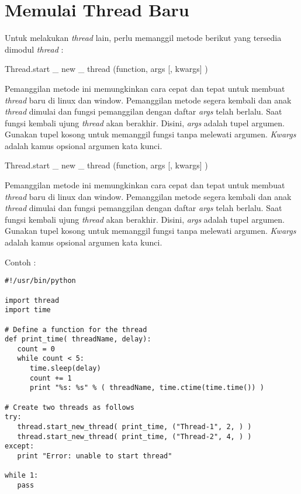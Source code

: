 \documentclass [12pt,a4paper,notitlepage,oneside,bahasa]{article}
\begin{document}
\section{Memulai Thread Baru}
\noindent 
\hspace*{0.5in} Untuk melakukan \textit{thread} lain, perlu memanggil metode berikut yang tersedia dimodul \textit{thread} :
\noindent 
\begin{center}{\fontsize{9pt}{9pt}\selectfont Thread.start  \_  new   \_  thread (function, args [, kwargs] )}\end{center}
Pemanggilan metode ini memungkinkan cara cepat dan tepat untuk membuat \textit{thread} baru di linux dan window.
Pemanggilan metode segera kembali dan anak  \textit{thread} dimulai dan fungsi pemanggilan dengan daftar \textit{args} telah berlalu. Saat fungsi kembali ujung \textit{thread} akan berakhir.
Disini, \textit{args }adalah tupel argumen. Gunakan tupel kosong untuk memanggil fungsi tanpa melewati argumen. \textit{Kwargs} adalah kamus opsional argumen kata kunci.
\begin{center}{\fontsize{9pt}{9pt}\selectfont Thread.start  \_  new   \_  thread (function, args [, kwargs] )}\end{center}
Pemanggilan metode ini memungkinkan cara cepat dan tepat untuk membuat \textit{thread} baru di linux dan window.
Pemanggilan metode segera kembali dan anak  \textit{thread} dimulai dan fungsi pemanggilan dengan daftar \textit{args} telah berlalu. Saat fungsi kembali ujung \textit{thread} akan berakhir.
Disini, \textit{args }adalah tupel argumen. Gunakan tupel kosong untuk memanggil fungsi tanpa melewati argumen. \textit{Kwargs} adalah kamus opsional argumen kata kunci.
\noindent 
\par
\noindent 




\newpage

\vspace{12pt}
\vspace{12pt}
\noindent 
Contoh : 
\begin{verbatim}
#!/usr/bin/python

import thread
import time

# Define a function for the thread
def print_time( threadName, delay):
   count = 0
   while count < 5:
      time.sleep(delay)
      count += 1
      print "%s: %s" % ( threadName, time.ctime(time.time()) )

# Create two threads as follows
try:
   thread.start_new_thread( print_time, ("Thread-1", 2, ) )
   thread.start_new_thread( print_time, ("Thread-2", 4, ) )
except:
   print "Error: unable to start thread"

while 1:
   pass
\end{verbatim}
	
\end{document}

